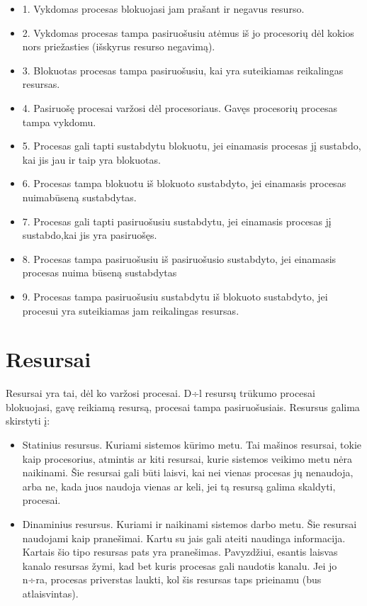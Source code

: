 \documentclass[oneside]{VUMIFPSkursinis}
\begin{document}
\begin{itemize}
	\item 1. Vykdomas procesas blokuojasi jam prašant ir negavus resurso. 
	\item 2. Vykdomas procesas tampa pasiruošusiu atėmus iš jo procesorių dėl kokios nors priežasties (išskyrus resurso negavimą). 
	\item 3. Blokuotas procesas tampa pasiruošusiu, kai yra suteikiamas reikalingas resursas. 
	\item 4. Pasiruošę procesai varžosi dėl procesoriaus. Gavęs procesorių procesas tampa vykdomu. 
	\item 5. Procesas gali tapti sustabdytu blokuotu, jei einamasis procesas jį sustabdo, kai jis jau ir taip yra blokuotas. 
	\item 6. Procesas tampa blokuotu iš blokuoto sustabdyto, jei einamasis procesas nuimabūseną sustabdytas. 
	\item 7. Procesas gali tapti pasiruošusiu sustabdytu, jei einamasis procesas jį sustabdo,kai jis yra pasiruošęs.
	\item 8. Procesas tampa pasiruošusiu iš pasiruošusio sustabdyto, jei einamasis procesas nuima būseną sustabdytas 
	\item 9. Procesas tampa pasiruošusiu sustabdytu iš blokuoto sustabdyto, jei procesui yra suteikiamas jam reikalingas resursas. 

\end{itemize}

\section{Resursai} Resursai yra tai, dėl ko varžosi procesai.  D÷l resursų trūkumo procesai blokuojasi, gavę reikiamą resursą, procesai tampa pasiruošusiais. Resursus galima skirstyti į: 
\linebreak
\begin{itemize}
	\item  Statinius resursus. Kuriami sistemos kūrimo metu. Tai mašinos resursai, tokie kaip procesorius, atmintis ar kiti resursai, kurie sistemos veikimo metu nėra naikinami. Šie resursai gali būti laisvi, kai nei vienas procesas jų nenaudoja, arba ne, kada juos naudoja vienas ar keli, jei tą resursą galima skaldyti, procesai. 
	\item  Dinaminius resursus. Kuriami ir naikinami sistemos darbo metu. Šie resursai naudojami kaip pranešimai. Kartu su jais gali ateiti naudinga informacija. Kartais šio tipo resursas pats yra pranešimas. Pavyzdžiui, esantis laisvas kanalo resursas žymi, kad bet kuris procesas gali naudotis kanalu. Jei jo n÷ra, procesas priverstas laukti, kol šis resursas taps prieinamu (bus atlaisvintas).
\end{itemize}
\end{document}
